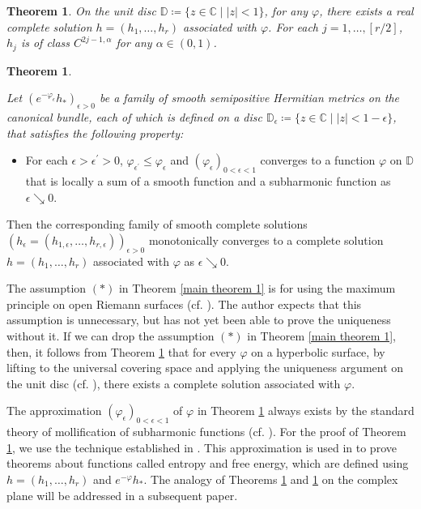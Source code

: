 \documentclass[12pt]{article}
\theoremstyle{definition}
\newtheorem{theo}[defi]{Theorem}
\def\refe{\ast}
\def\C{{\mathbb C}}
\def\D{{\mathbb D}}
\begin{document}
\begin{theo}\label{main theorem 2} {\it On the unit disc $\D\coloneqq \{z\in\C\mid |z|<1\}$, for any $\varphi$, there exists a real complete solution $h=(h_1,\dots, h_r)$ associated with $\varphi$. For each $j=1,\dots, [r/2]$, $h_j$ is of class $C^{2j-1,\alpha}$ for any $\alpha\in(0,1)$. }
\end{theo}
\begin{theo}\label{main theorem 3}{\it
Let $(e^{-\varphi_\epsilon}h_\refe)_{\epsilon>0}$ be a family of smooth semipositive Hermitian metrics on the canonical bundle, each of which is defined on a disc $\D_\epsilon \coloneqq \{z \in \C \mid |z| < 1 - \epsilon\}$, that satisfies the following property:
\begin{itemize}
\item For each $\epsilon>\epsilon^\prime>0$, $\varphi_{\epsilon^\prime}\leq \varphi_\epsilon$ and $(\varphi_\epsilon)_{0<\epsilon<1}$ converges to a function $\varphi$ on $\D$ that is locally a sum of a smooth function and a subharmonic function as $\epsilon\searrow 0$.
\end{itemize}
Then the corresponding family of smooth complete solutions $(h_\epsilon=(h_{1,\epsilon},\dots, h_{r,\epsilon}))_{\epsilon>0}$ monotonically converges to a complete solution $h=(h_1,\dots, h_r)$ associated with $\varphi$ as $\epsilon\searrow 0$.}
\end{theo}

The assumption $(\ast)$ in Theorem \ref{main theorem 1} is for using the maximum principle on open Riemann surfaces (cf. \cite[Section 3]{LM1}). The author expects that this assumption is unnecessary, but has not yet been able to prove the uniqueness without it. If we can drop the assumption $(\ast)$ in Theorem \ref{main theorem 1}, then, it follows from Theorem \ref{main theorem 2} that for every $\varphi$ on a hyperbolic surface, by lifting to the universal covering space and applying the uniqueness argument on the unit disc (cf. \cite[Proposition 5.7]{LM1}), there exists a complete solution associated with $\varphi$.

The approximation $(\varphi_\epsilon)_{0<\epsilon<1}$ of $\varphi$ in Theorem \ref{main theorem 3} always exists by the standard theory of mollification of subharmonic functions (cf. \cite{Ran1}). For the proof of Theorem \ref{main theorem 3}, we use the technique established in \cite[Proposition 4.6]{LM1}. This approximation is used in \cite{Miy4, Miy5} to prove theorems about functions called entropy and free energy, which are defined using $h=(h_1,\dots, h_r)$ and $e^{-\varphi}h_\refe$. The analogy of Theorems \ref{main theorem 2} and \ref{main theorem 3} on the complex plane will be addressed in a subsequent paper.
\end{document}
